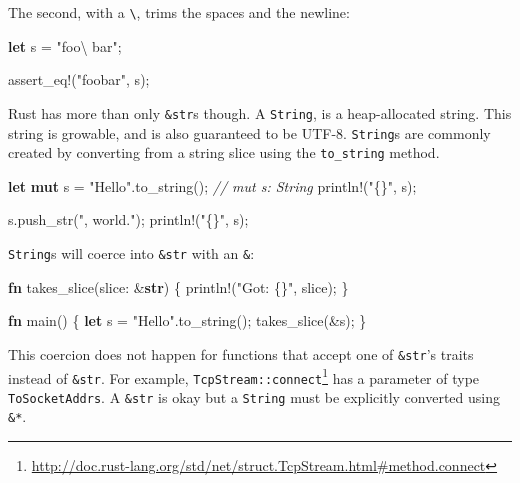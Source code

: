\documentclass[a4paper,]{book}
\newenvironment{Shaded}{\begin{snugshade}}{\end{snugshade}}
\newcommand{\KeywordTok}[1]{\textcolor[rgb]{0.13,0.29,0.53}{\textbf{{#1}}}}
\newcommand{\StringTok}[1]{\textcolor[rgb]{0.31,0.60,0.02}{{#1}}}
\newcommand{\CommentTok}[1]{\textcolor[rgb]{0.56,0.35,0.01}{\textit{{#1}}}}
\newcommand{\OtherTok}[1]{\textcolor[rgb]{0.56,0.35,0.01}{{#1}}}
\newcommand{\NormalTok}[1]{{#1}}
\renewcommand{\href}[2]{#2\footnote{\url{#1}}}
\begin{document}
The second, with a \texttt{\textbackslash{}}, trims the spaces and the
newline:

\begin{Shaded}
\begin{Highlighting}[]
\KeywordTok{let} \NormalTok{s = }\StringTok{"foo\textbackslash{}}
\StringTok{    bar"}\NormalTok{;}

\OtherTok{assert_eq!}\NormalTok{(}\StringTok{"foobar"}\NormalTok{, s);}
\end{Highlighting}
\end{Shaded}

Rust has more than only \texttt{\&str}s though. A \texttt{String}, is a
heap-allocated string. This string is growable, and is also guaranteed
to be UTF-8. \texttt{String}s are commonly created by converting from a
string slice using the \texttt{to\_string} method.

\begin{Shaded}
\begin{Highlighting}[]
\KeywordTok{let} \KeywordTok{mut} \NormalTok{s = }\StringTok{"Hello"}\NormalTok{.to_string(); }\CommentTok{// mut s: String}
\OtherTok{println!}\NormalTok{(}\StringTok{"\{\}"}\NormalTok{, s);}

\NormalTok{s.push_str(}\StringTok{", world."}\NormalTok{);}
\OtherTok{println!}\NormalTok{(}\StringTok{"\{\}"}\NormalTok{, s);}
\end{Highlighting}
\end{Shaded}

\texttt{String}s will coerce into \texttt{\&str} with an \texttt{\&}:

\begin{Shaded}
\begin{Highlighting}[]
\KeywordTok{fn} \NormalTok{takes_slice(slice: &}\KeywordTok{str}\NormalTok{) \{}
    \OtherTok{println!}\NormalTok{(}\StringTok{"Got: \{\}"}\NormalTok{, slice);}
\NormalTok{\}}

\KeywordTok{fn} \NormalTok{main() \{}
    \KeywordTok{let} \NormalTok{s = }\StringTok{"Hello"}\NormalTok{.to_string();}
    \NormalTok{takes_slice(&s);}
\NormalTok{\}}
\end{Highlighting}
\end{Shaded}

This coercion does not happen for functions that accept one of
\texttt{\&str}'s traits instead of \texttt{\&str}. For example,
\href{http://doc.rust-lang.org/std/net/struct.TcpStream.html\#method.connect}{\texttt{TcpStream::connect}}
has a parameter of type \texttt{ToSocketAddrs}. A \texttt{\&str} is okay
but a \texttt{String} must be explicitly converted using \texttt{\&*}.
\end{document}
